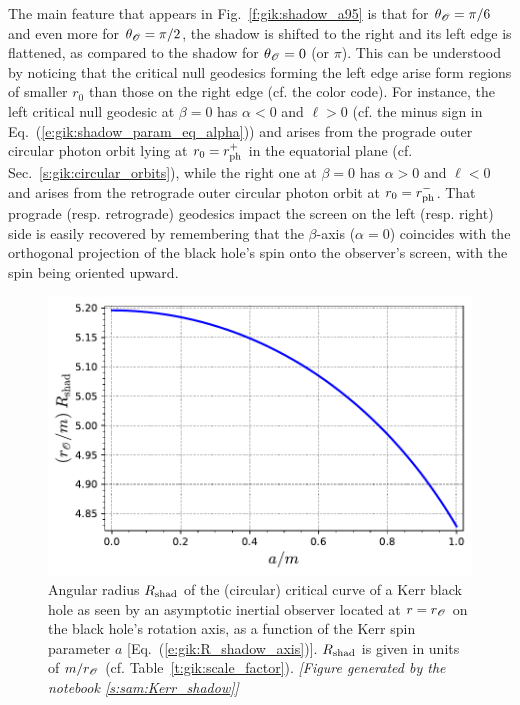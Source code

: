 The main feature that appears in Fig.~\ref{f:gik:shadow_a95}
is that for $\theta_{\mathscr{O}} = \pi/6$ and even more for $\theta_{\mathscr{O}} = \pi/2$, the shadow is shifted to the right and its left edge is flattened, as compared
to the shadow for $\theta_{\mathscr{O}}= 0$ (or $\pi$).
This can be understood by noticing that the
critical null geodesics forming the left edge arise form regions of smaller $r_0$
than those on the right edge (cf. the color code). For instance, the left critical null geodesic
at $\beta=0$ has $\alpha<0$ and $\ell > 0$ (cf. the minus sign in
Eq.~(\ref{e:gik:shadow_param_eq_alpha}))
and arises from the prograde outer circular photon orbit lying at $r_0 = r_{\rm ph}^+$
in the equatorial plane (cf. Sec.~\ref{s:gik:circular_orbits}), while the right one at $\beta=0$
has $\alpha>0$ and $\ell < 0$ and arises from the retrograde outer circular photon orbit
at $r_0 = r_{\rm ph}^-$. That prograde (resp. retrograde) geodesics impact the screen
on the left (resp. right) side is easily recovered by remembering that the $\beta$-axis
($\alpha=0$) coincides with the orthogonal projection of the black hole's spin onto the
observer's screen, with the spin being oriented upward.

\begin{figure}
\centerline{
\includegraphics[height=0.28\textheight]{gik_shadow_radius_axis.pdf} }
\caption[]{\label{f:gik:shadow_radius_axis} \footnotesize
Angular radius $R_{\rm shad}$ of the (circular) critical curve of a Kerr black
hole as seen by an asymptotic inertial observer located at $r=r_{\mathscr{O}}$ on the
black hole's rotation axis, as a function of the Kerr spin parameter $a$
[Eq.~(\ref{e:gik:R_shadow_axis})]. $R_{\rm shad}$ is given in units
of $m/r_{\mathscr{O}}$ (cf. Table~\ref{t:gik:scale_factor}).
\textsl{[Figure generated by the notebook \ref{s:sam:Kerr_shadow}]}
}
\end{figure}


